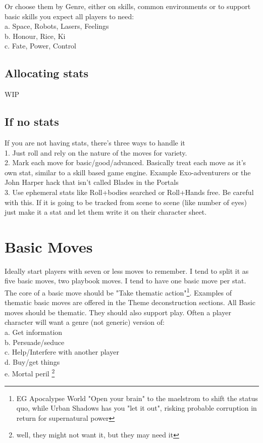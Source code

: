 \documentclass{tufte-handout}
\begin{document}
Or choose them by Genre, either on skills, common environments or to support basic skills you expect all players to need:\\ 
a. Space, Robots, Lasers,  Feelings\\
b. Honour, Rice, Ki\\
c. Fate, Power, Control \\

\subsection{Allocating stats}
WIP


\subsection{If no stats}
If you are not having stats, there's three ways to  handle it\\
1. Just roll and rely on the nature of the moves for variety.\\
2. Mark each move for basic/good/advanced. Basically treat each move as it's own stat, similar to a skill based game engine. Example  {Exo-adventurers or the John Harper hack that isn't called Blades in the Portals}\\
3. Use ephemeral stats like Roll+bodies searched or Roll+Hands free. Be careful with this. If it is going to be tracked from scene to scene (like number of eyes) just make it a stat and let them write it on their character sheet.

\section{Basic Moves}
Ideally start players with seven or less moves to remember. I tend to split it as five basic moves, two playbook moves. I tend to have one basic move per stat. The core of a basic move should be "Take thematic action"\footnote{EG Apocalypse World "Open your brain" to the maelstrom to shift the status quo, while Urban Shadows has you "let it out", risking probable corruption in return for supernatural power}. Examples of thematic basic moves are offered in the Theme deconstruction sections.
All Basic moves should be thematic. They should also support play. Often a player character will want a genre (not generic) version of:\\
a. Get information\\
b. Persuade/seduce\\
c. Help/Interfere with another player\\
d. Buy/get things\\
e. Mortal peril \footnote{well, they might not want it, but they may need it}\\
\end{document}
